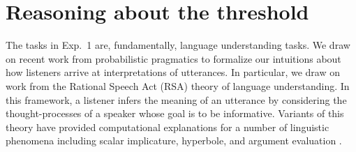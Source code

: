 \documentclass[10pt,letterpaper]{article}
\begin{document}
%
%



\section{Reasoning about the threshold}


The tasks in Exp.~1 are, fundamentally, language understanding tasks. We draw on recent work from probabilistic pragmatics to formalize our intuitions about how listeners arrive at interpretations of utterances. In particular, we draw on work from the Rational Speech Act (RSA) theory of language understanding. In this framework, a listener infers the meaning of an utterance by considering the thought-processes of a speaker whose goal is to be informative. Variants of this theory have provided computational explanations for a number of linguistic phenomena including scalar implicature, hyperbole, and argument evaluation \cite{Kao2014, Tessler2014, Lassiter2014}. 
\end{document}
